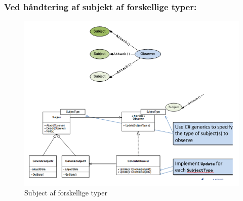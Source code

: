 \documentclass[../report.tex]{subfiles}
\begin{document}
\subsubsection*{Ved håndtering af subjekt af forskellige typer:}
\begin{figure}[H]
    \centering
    \includegraphics{pics/subject_different_type.PNG}
    \caption{Subject af forskellige typer}
    \label{fig:subject_diff_type}
\end{figure}
\end{document}
